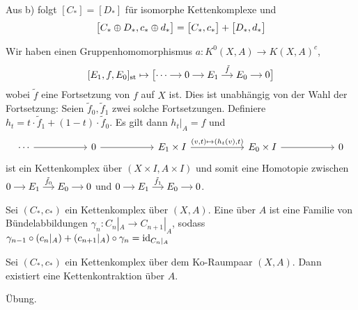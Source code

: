 \begin{bemerkung}
Aus b) folgt $[C_*] = [D_*]$ für isomorphe Kettenkomplexe und 
\[
	\benbrace[\big]{C_* \oplus  D_*, c_* \oplus d_*} = \benbrace[\big]{C_*,c_*} + \benbrace[\big]{D_*,d_*}
\]	
\end{bemerkung}

Wir haben einen Gruppenhomomorphismus $a \colon K^0(X,A) \to K(X,A)^c$, 
\[
	[E_1,f,E_0]_\st \mapsto\big[\begin{tikzcd}[cramped,sep=small] \cdots \rar & 0 \rar & E_1 \rar["\tilde{f}"] & E_0 \rar & 0 \end{tikzcd}\big]
\]
wobei $\tilde{f}$ eine Fortsetzung von $f$ auf $X$ ist. Dies ist unabhängig von der Wahl der Fortsetzung: Seien $\tilde{f}_0, \tilde{f}_1$ zwei solche Fortsetzungen. Definiere 
$h_t = t \cdot \tilde{f}_1 + (1-t) \cdot \tilde{f}_0$. Es gilt dann $h_t|_A =f$ und 
\[
	\begin{tikzcd}[sep=5.5em]
		\cdots \rar & 0  \rar & E_1 \times I \rar["{(v,t) \mapsto (h_t(v),t)}"] & E_0 \times I \rar & 0
	\end{tikzcd}
\]
ist ein Kettenkomplex über $(X \times I, A \times I)$ und somit eine Homotopie zwischen 
$\begin{tikzcd}[cramped,sep=small]0 \rar & E_1 \rar["\tilde{f}_0"] & E_0 \rar & 0\end{tikzcd}$ und 
$\begin{tikzcd}[cramped,sep=small]0 \rar & E_1 \rar["\tilde{f}_1"] & E_0 \rar & 0\end{tikzcd}$. 


\begin{definition}[label=sub:def_312]
Sei $(C_*,c_*)$ ein Kettenkomplex über $(X,A)$.
Eine  über $A$ ist eine Familie von Bündelabbildungen $\gamma_n \colon C_n|_A \to C_{n+1}|_{A}$, sodass 
$\gamma_{n-1} \circ (c_n|_A) + (c_{n+1}|_A) \circ \gamma_n = \id_{C_n|_A}$ 
\end{definition}


\begin{lemma}[label=sub:lemma_3_1_3]
Sei $(C_*,c_*)$ ein Kettenkomplex über dem Ko-Raumpaar $(X,A)$. Dann existiert eine Kettenkontraktion über $A$.	
\end{lemma}
\begin{beweis}
Übung.
\end{beweis}


